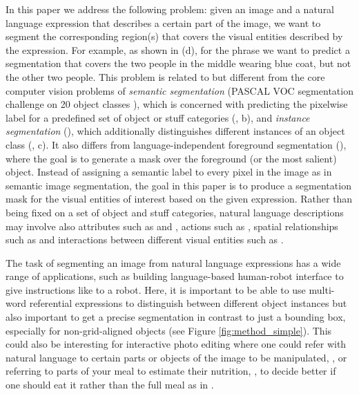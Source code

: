 \documentclass[runningheads]{llncs}
\begin{document}
In this paper we address the following problem: given an image and a natural language expression that describes a certain part of the image, we want to segment the corresponding region(s) that covers the visual entities described by the expression. For example, as shown in  (d), for the phrase \eg {} we want to predict a segmentation that covers the two people in the middle wearing blue coat, but not the other two people. This problem is related to but different from the core computer vision problems of \emph{semantic segmentation} (\eg PASCAL VOC segmentation challenge on 20 object classes \cite{pascal-voc-2012}), which is concerned with predicting the pixelwise label for a predefined set of object or stuff categories (, b), and \emph{instance segmentation} (\eg \cite{hariharan2014simultaneous}), which additionally distinguishes different instances of an object class (, c). It also differs from language-independent foreground segmentation (\eg \cite{rother2004grabcut}), where the goal is to generate a mask over the foreground (or the most salient) object. Instead of assigning a semantic label to every pixel in the image as in semantic image segmentation, the goal in this paper is to produce a segmentation mask for the visual entities of interest based on the given expression. Rather than being fixed on a set of object and stuff categories, natural language descriptions may involve also attributes such as  and , actions such as , spatial relationships such as  and interactions between different visual entities such as .

The task of segmenting an image from natural language expressions has a wide range of applications, such as building language-based human-robot interface to give instructions like  to a robot. Here, it is important to be able to use multi-word referential expressions to distinguish between different object instances but also important to get a precise segmentation in contrast to just a bounding box, especially for non-grid-aligned objects (see \eg Figure \ref{fig:method_simple}). This could also be interesting for interactive photo editing where one could refer with natural language to certain parts or objects of the image to be manipulated, \eg {}, or referring to parts of your meal to estimate their nutrition, , to decide better if one should eat it rather than the full meal as in \cite{meyers15iccv}. 
\end{document}
